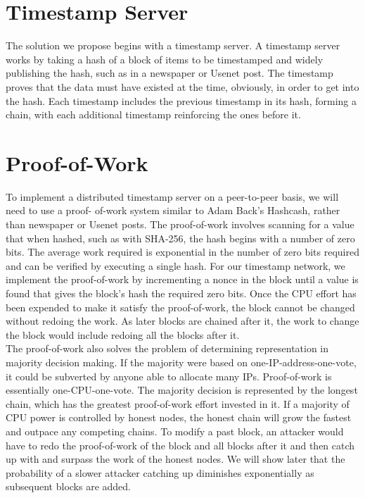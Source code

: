 \documentclass{article}
\begin{document}
\section{Timestamp Server}\label{sec:timestamp-server}
The solution we propose begins with a timestamp server.
A timestamp server works by taking a
hash of a block of items to be timestamped and widely publishing the hash, such as in a
newspaper or Usenet post\cite{massias1999design, haber1991time, bayer1993improving, haber1997secure}.
The timestamp proves that the data must have existed at the
time, obviously, in order to get into the hash.
Each timestamp includes the previous timestamp in
its hash, forming a chain, with each additional timestamp reinforcing the ones before it. \\



\section{Proof-of-Work}\label{sec:proof-of-work}
To implement a distributed timestamp server on a peer-to-peer basis, we will need to use a proof-
of-work system similar to Adam Back's Hashcash\cite{back2002hashcash}, rather than newspaper or Usenet posts.
The proof-of-work involves scanning for a value that when hashed, such as with SHA-256, the
hash begins with a number of zero bits.
The average work required is exponential in the number
of zero bits required and can be verified by executing a single hash.
For our timestamp network, we implement the proof-of-work by incrementing a nonce in the
block until a value is found that gives the block's hash the required zero bits.
Once the CPU
effort has been expended to make it satisfy the proof-of-work, the block cannot be changed
without redoing the work.
As later blocks are chained after it, the work to change the block
would include redoing all the blocks after it. \\



The proof-of-work also solves the problem of determining representation in majority decision making.
If the majority were based on one-IP-address-one-vote, it could be subverted by anyone
able to allocate many IPs. Proof-of-work is essentially one-CPU-one-vote.
The majority
decision is represented by the longest chain, which has the greatest proof-of-work effort invested
in it.
If a majority of CPU power is controlled by honest nodes, the honest chain will grow the
fastest and outpace any competing chains.
To modify a past block, an attacker would have to
redo the proof-of-work of the block and all blocks after it and then catch up with and surpass the
work of the honest nodes.
We will show later that the probability of a slower attacker catching up
diminishes exponentially as subsequent blocks are added.
\end{document}
